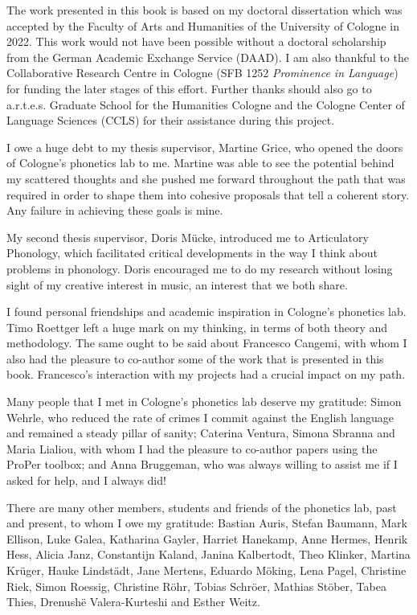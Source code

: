 \addchap{\lsAcknowledgementTitle} 

The work presented in this book is based on my doctoral dissertation which was accepted by the Faculty of Arts and Humanities of the University of Cologne in 2022. This work would not have been possible without a doctoral scholarship from the German Academic Exchange Service (DAAD). 
I am also thankful to the Collaborative Research Centre in Cologne (SFB 1252 \emph{Prominence in Language}) for funding the later stages of this effort. Further thanks should also go to a.r.t.e.s. Graduate School for the Humanities Cologne and the Cologne Center of Language Sciences (CCLS) for their assistance during this project. 

I owe a huge debt to my thesis supervisor, Martine Grice, who opened the doors of Cologne's phonetics lab to me. Martine was able to see the potential behind my scattered thoughts and she pushed me forward throughout the path that was required in order to shape them into cohesive proposals that tell a coherent story. Any failure in achieving these goals is mine.

My second thesis supervisor, Doris Mücke, introduced me to Articulatory Phonology, which facilitated critical developments in the way I think about problems in phonology. Doris encouraged me to do my research without losing sight of my creative interest in music, an interest that we both share.

I found personal friendships and academic inspiration in Cologne's phonetics lab. Timo Roettger left a huge mark on my thinking, in terms of both theory and methodology. The same ought to be said about Francesco Cangemi, with whom I also had the pleasure to co-author some of the work that is presented in this book. Francesco's interaction with my projects had a crucial impact on my path.

Many people that I met in Cologne's phonetics lab deserve my gratitude: Simon Wehrle, who reduced the rate of crimes I commit against the English language and remained a steady pillar of sanity; Caterina Ventura, Simona Sbranna and Maria Lialiou, with whom I had the pleasure to co-author papers using the ProPer toolbox; and Anna Bruggeman, who was always willing to assist me if I asked for help, and I always did!

There are many other members, students and friends of the phonetics lab, past and present, to whom I owe my gratitude: Bastian Auris, Stefan Baumann, Mark Ellison, Luke Galea, Katharina Gayler, Harriet Hanekamp, Anne Hermes, Henrik Hess, Alicia Janz, Constantijn Kaland, Janina Kalbertodt, Theo Klinker, Martina Krüger, Hauke Lindstädt, Jane Mertens, Eduardo Möking, Lena Pagel, Christine Riek, Simon Roessig, Christine Röhr, Tobias Schröer, Mathias Stöber, Tabea Thies, Drenushë Valera-Kurteshi and Esther Weitz.

